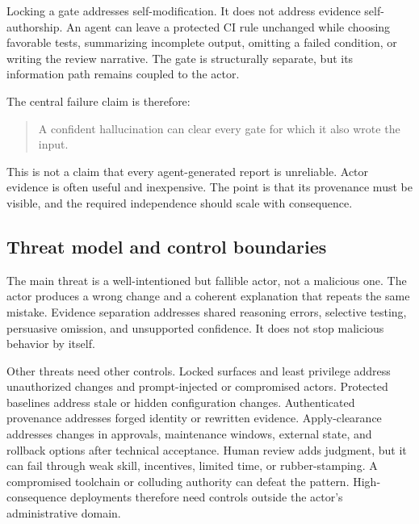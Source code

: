 \documentclass[11pt]{article}
\begin{document}
Locking a gate addresses self-modification. It does not address evidence self-authorship. An agent can leave a protected CI rule unchanged while choosing favorable tests, summarizing incomplete output, omitting a failed condition, or writing the review narrative. The gate is structurally separate, but its information path remains coupled to the actor.

The central failure claim is therefore:

\begin{quote}
A confident hallucination can clear every gate for which it also wrote the input.
\end{quote}

This is not a claim that every agent-generated report is unreliable. Actor evidence is often useful and inexpensive. The point is that its provenance must be visible, and the required independence should scale with consequence.

\subsection{Threat model and control boundaries}

The main threat is a well-intentioned but fallible actor, not a malicious one. The actor produces a wrong change and a coherent explanation that repeats the same mistake. Evidence separation addresses shared reasoning errors, selective testing, persuasive omission, and unsupported confidence. It does not stop malicious behavior by itself.

Other threats need other controls. Locked surfaces and least privilege address unauthorized changes and prompt-injected or compromised actors. Protected baselines address stale or hidden configuration changes. Authenticated provenance addresses forged identity or rewritten evidence. Apply-clearance addresses changes in approvals, maintenance windows, external state, and rollback options after technical acceptance. Human review adds judgment, but it can fail through weak skill, incentives, limited time, or rubber-stamping. A compromised toolchain or colluding authority can defeat the pattern. High-consequence deployments therefore need controls outside the actor's administrative domain.
\end{document}
